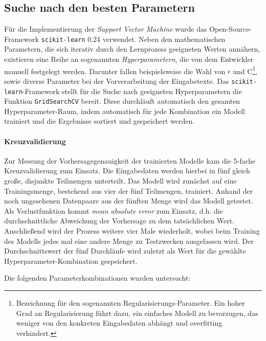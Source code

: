 \subsection{Suche nach den besten Parametern}\label{sec:hyperparams}
Für die Implementierung der \textit{Support Vector Machine} wurde das Open-Source-Framework \texttt{scikit-learn} 0.24 \citep{JMLR:v12:pedregosa11a} verwendet. Neben den mathematischen Parametern, die sich iterativ durch den Lernprozess geeigneten Werten annähern, existieren eine Reihe an sogenannten \textit{Hyperparametern}, die von dem Entwickler manuell festgelegt werden. Darunter fallen beispielsweise die Wahl von $\epsilon$ und C\footnote{Bezeichnung für den sogenannten Regularisierungs-Parameter. Ein hoher Grad an Regularisierung führt dazu, ein einfaches Modell zu bevorzugen, das weniger von den konkreten Eingabedaten abhängt und overfitting verhindert.}, sowie diverse Parameter bei der Vorverarbeitung der Eingabetexte. Das \texttt{scikit-learn}-Framework stellt für die Suche nach geeigneten Hyperparametern die Funktion \texttt{GridSearchCV} bereit. Diese durchläuft automatisch den gesamten Hyperparameter-Raum, indem automatisch für jede Kombination ein Modell trainiert und die Ergebnisse sortiert und gespeichert werden. 

\paragraph{Kreuzvalidierung} Zur Messung der Vorhersagegenauigkeit der trainierten Modelle kam die 5-fache Kreuzvalidierung zum Einsatz. Die Eingabedaten werden hierbei in fünf gleich große, disjunkte Teilmengen unterteilt. Das Modell wird zunächst auf eine Trainingsmenge, bestehend aus vier der fünf Teilmengen, trainiert. Anhand der noch ungesehenen Datenpaare aus der fünften Menge wird das Modell getestet. Als Verlustfunktion kommt \textit{mean absolute error} zum Einsatz, d.h. die durchschnittliche Abweichung der Vorhersage zu dem tatsächlichen Wert. Anschließend wird der Prozess weitere vier Male wiederholt, wobei beim Training des Modells jedes mal eine andere Menge zu Testzwecken ausgelassen wird. Der Durchschnittswert der fünf Durchläufe wird zuletzt als Wert für die gewählte Hyperparameter-Kombination gespeichert.

Die folgenden Parameterkombinationen wurden untersucht:

